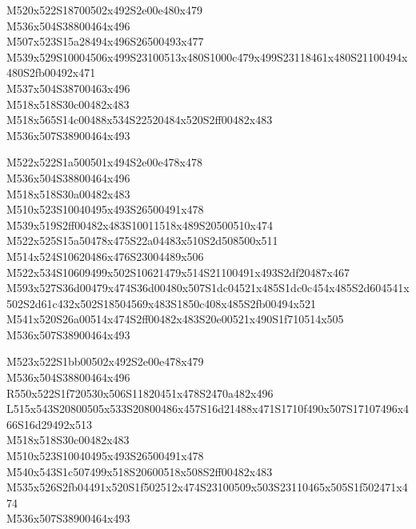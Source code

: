 \documentclass{article}
\begin{document}
\begin{multicols}{5}
\begin{center}

M520x522S18700502x492S2e00e480x479 %
\\M536x504S38800464x496 %
\\M507x523S15a28494x496S26500493x477 %
\\M539x529S10004506x499S23100513x480S1000c479x499S23118461x480S21100494x480S2fb00492x471 %
\\M537x504S38700463x496 %
\\M518x518S30c00482x483 %
\\M518x565S14c00488x534S22520484x520S2ff00482x483 %
\\M536x507S38900464x493 %
\vfil
\columnbreak

M522x522S1a500501x494S2e00e478x478 %
\\M536x504S38800464x496 %
\\M518x518S30a00482x483 %
\\M510x523S10040495x493S26500491x478 %
\\M539x519S2ff00482x483S10011518x489S20500510x474 %
\\M522x525S15a50478x475S22a04483x510S2d508500x511 %
\\M514x524S10620486x476S23004489x506 %
\\M522x534S10609499x502S10621479x514S21100491x493S2df20487x467 %
\\M593x527S36d00479x474S36d00480x507S1dc04521x485S1dc0c454x485S2d604541x502S2d61c432x502S18504569x483S1850c408x485S2fb00494x521 %
\\M541x520S26a00514x474S2ff00482x483S20e00521x490S1f710514x505 %
\\M536x507S38900464x493 %
\vfil
\columnbreak

M523x522S1bb00502x492S2e00e478x479 %
\\M536x504S38800464x496 %
\\R550x522S1f720530x506S11820451x478S2470a482x496 %
\\L515x543S20800505x533S20800486x457S16d21488x471S1710f490x507S17107496x466S16d29492x513 %
\\M518x518S30c00482x483 %
\\M510x523S10040495x493S26500491x478 %
\\M540x543S1c507499x518S20600518x508S2ff00482x483 %
\\M535x526S2fb04491x520S1f502512x474S23100509x503S23110465x505S1f502471x474 %
\\M536x507S38900464x493 %
\vfil
\columnbreak


\end{center}
\end{multicols}
\end{document}
